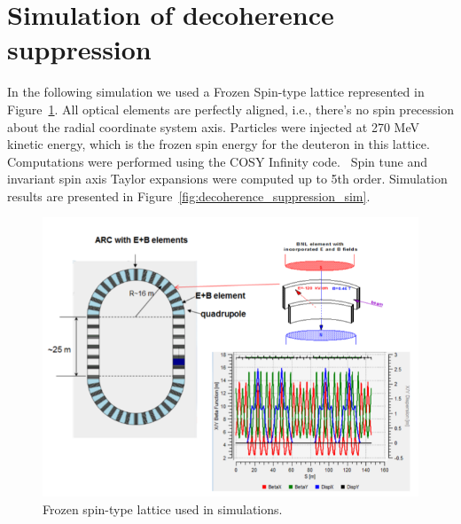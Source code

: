 \documentclass[a4paper]{jacow}
\begin{document}
\section{Simulation of decoherence suppression}
In the following simulation we used a Frozen Spin-type lattice represented in Figure~\ref{fig:FSBNL_lattice}. All optical elements are perfectly aligned, i.e., there's no spin precession about the radial coordinate system axis. Particles were injected at 270 MeV kinetic energy, which is the frozen spin energy for the deuteron in this lattice. Computations were performed using the COSY Infinity code.~\cite{COSY:Website} Spin tune and invariant spin axis Taylor expansions were computed up to 5th order. Simulation results are presented in Figure~\ref{fig:decoherence_suppression_sim}.

\begin{figure}[h!]
  \centering
  \includegraphics[width=\linewidth]{../img/Lattice/BNL}
  \caption{Frozen spin-type lattice used in simulations.\label{fig:FSBNL_lattice}}
\end{figure}
\end{document}
